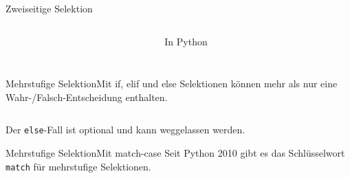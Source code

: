 \documentclass[xelatex,aspectratio=169]{beamer}
\begin{document}
\begin{frame}{Zweiseitige Selektion}
\begin{columns}[t]
\begin{column}{.3\linewidth}
    \end{column}
    \begin{column}{.3\linewidth}
      \begin{block}{In Python}
        \begin{minipage}[c][.7\textheight][c]{\textwidth}
          \inputminted{python}{src/algorithmus_zweiseitige_selektion.py}
        \end{minipage}
      \end{block}

    \end{column}
  \end{columns}

\end{frame}

\begin{frame}{Mehrstufige Selektion}{Mit if, elif und else}
  Selektionen können mehr als nur eine Wahr-/Falsch-Entscheidung enthalten.

  \inputminted{python}{src/algorithmus_mehrstufige_selektion.py}

  Der \texttt{else}-Fall ist optional und kann weggelassen werden.
\end{frame}


\begin{frame}{Mehrstufige Selektion}{Mit match-case}
  Seit Python 2010 gibt es das Schlüsselwort \texttt{match} für mehrstufige Selektionen.

  \inputminted{python}{src/algorithmus_mehrstufige_selektion_match.py}

\end{frame}
\end{document}
